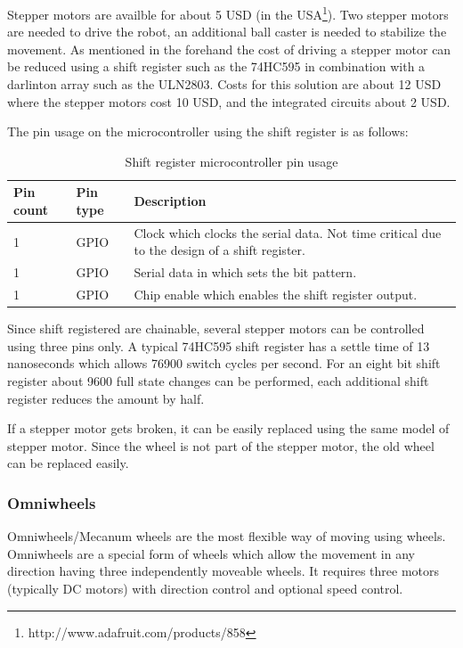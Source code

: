 \documentclass[11pt,a4paper]{article}
\begin{document}
Stepper motors are availble for about 5 USD (in the USA\footnote{http://www.adafruit.com/products/858}). Two stepper motors are needed to drive the robot, an additional ball caster is needed to stabilize the movement. As mentioned in the forehand the cost of driving a stepper motor can be reduced using a shift register such as the 74HC595 in combination with a darlinton array such as the ULN2803. Costs for this solution are about 12 USD where the stepper motors cost 10 USD, and the integrated circuits about 2 USD.

The pin usage on the microcontroller using the shift register is as follows:

\begin{table}[h!]
\centering
\begin{tabular}{p{}p{}p{}}
\toprule
Pin count & Pin type & Description \\
\midrule
1 & GPIO & Clock which clocks the serial data. Not time critical due to the design of a shift register.\\
1 & GPIO & Serial data in which sets the bit pattern.\\
1 & GPIO & Chip enable which enables the shift register output.\\
\bottomrule
\end{tabular}
\caption{Shift register microcontroller pin usage}
\label{tbl:74hc595_pin}
\end{table}

Since shift registered are chainable, several stepper motors can be controlled using three pins only. A typical 74HC595 shift register has a settle time of 13 nanoseconds which allows 76900 switch cycles per second. For an eight bit shift register about 9600 full state changes can be performed, each additional shift register reduces the amount by half.

If a stepper motor gets broken, it can be easily replaced using the same model of stepper motor. Since the wheel is not part of the stepper motor, the old wheel can be replaced easily.
\subsubsection{Omniwheels}
Omniwheels/Mecanum wheels are the most flexible way of moving using wheels. Omniwheels are a special form of wheels which allow the movement in any direction having three independently moveable wheels. It requires three motors (typically DC motors) with direction control and optional speed control.
\end{document}
